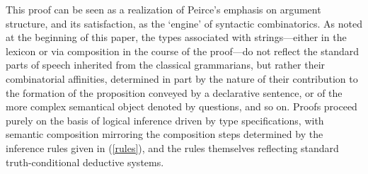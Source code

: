 \documentclass[output=paper,colorlinks,citecolor=brown]{langscibook}
\begin{document}
This proof can be seen as a realization of Peirce's emphasis on
argument structure, and its satisfaction, as the `engine' of syntactic
combinatorics. As noted at the beginning of this paper, the types
associated with strings---either in the lexicon or via composition in
the course of the proof---do not reflect the standard parts of speech
inherited from the classical grammarians, but rather their
combinatorial affinities, determined in part by the nature of their
contribution to the formation of the proposition conveyed by a
declarative sentence, or of the more complex semantical object denoted
by questions, and so on. Proofs proceed purely on the basis of logical
inference driven by type specifications, with semantic composition
mirroring the composition steps determined by the inference
rules given in (\ref{rules}), and the rules themselves reflecting standard
truth-conditional deductive systems.
\end{document}
